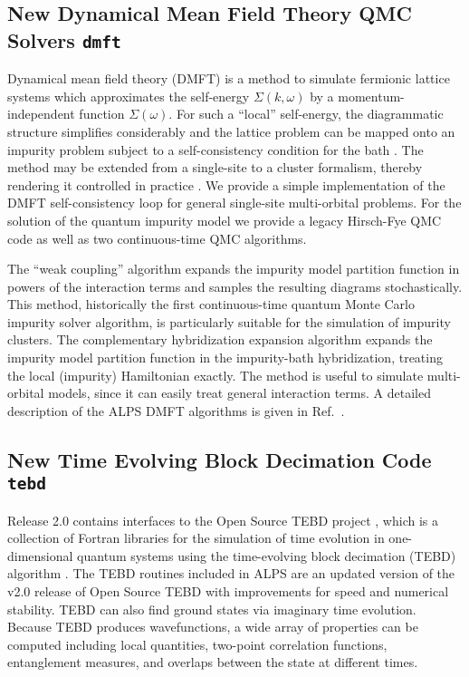 \documentclass[12pt]{iopart}
\begin{document}
\subsection{New Dynamical Mean Field Theory QMC Solvers {\tt dmft}}
Dynamical mean field theory (DMFT) is a method to simulate fermionic lattice systems which approximates the self-energy $\Sigma(k,\omega)$ by a momentum-independent 
function $\Sigma(\omega)$. For such a ``local'' self-energy, the diagrammatic structure simplifies considerably and the lattice problem can be mapped onto an impurity problem subject to a self-consistency condition for the bath \cite{Georges96,Kotliar06}. The method may be extended from a single-site to a cluster formalism, thereby rendering it controlled in practice \cite{Maier05}.
We provide a simple implementation of the DMFT self-consistency loop for general single-site multi-orbital problems.
For the solution of the quantum impurity model we provide a legacy Hirsch-Fye QMC code \cite{Hirsch86} as well as two continuous-time QMC algorithms.

The ``weak coupling'' algorithm \cite{Rubtsov04,Rubtsov05} expands the impurity model partition function in powers of the interaction terms and samples the resulting diagrams stochastically. This method, historically
the first continuous-time quantum Monte Carlo impurity solver algorithm, is particularly suitable for the simulation of impurity clusters.
The complementary hybridization expansion algorithm \cite{Werner06,Werner06Kondo} expands the impurity model partition function in the impurity-bath hybridization, treating 
the local (impurity) Hamiltonian exactly. 
The method is useful to simulate multi-orbital models, since it can easily treat general interaction terms. A detailed description of the ALPS DMFT algorithms is given in Ref.~\cite{ALPSDMFT}.

\subsection{New Time Evolving Block Decimation Code {\tt tebd}}
Release 2.0 contains interfaces to the Open Source TEBD project \cite{ostebd}, which is a collection of Fortran libraries for the simulation of time evolution in one-dimensional quantum systems using the time-evolving block decimation (TEBD) algorithm \cite{vidal1,vidal2}. The TEBD routines included in ALPS are an updated version of the v2.0 release of Open Source TEBD with improvements for speed and numerical stability.  TEBD can also find ground states via imaginary time evolution.  Because TEBD produces wavefunctions, a wide array of properties can be computed including local quantities, two-point correlation functions, entanglement measures, and overlaps between the state at different times.
\end{document}
